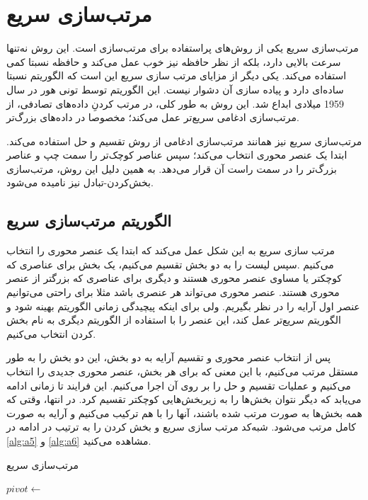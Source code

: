 \documentclass[12pt]{article}
\begin{document}
\section{مرتب‌سازی سریع\protect{}}
مرتب‌سازی سریع یکی از روش‌های پراستفاده برای مرتب‌سازی است.
این روش نه‌تنها سرعت بالایی دارد، بلکه از نظر حافظه نیز خوب عمل می‌کند و حافظه نسبتا کمی استفاده می‌کند.
یکی دیگر از مزایای مرتب سازی سریع این است که الگوریتم نسبتا ساده‌ای دارد
و پیاده سازی آن دشوار نیست.
این الگوریتم توسط تونی هور
در سال 1959 میلادی ابداع شد.\cite{quick0}
این روش به طور کلی، در مرتب کردنِ داده‌های تصادفی، از مرتب‌سازی ادغامی
سریع‌تر عمل می‌کند؛ مخصوصا در داده‌های بزرگ‌تر.\cite{quick1}

مرتب‌سازی سریع نیز همانند مرتب‌سازی ادغامی
از روش تقسیم و حل
استفاده می‌کند.
ابتدا یک عنصر محوری
انتخاب می‌کند؛ سپس عناصر کوچک‌تر را سمت چپ
و عناصر بزرگ‌تر را در سمت راست آن قرار می‌دهد.
به همین دلیل این روش، مرتب‌سازی بخش‌کردن-تبادل
نیز نامیده می‌شود.\cite{quick2}


\subsection*{الگوریتم مرتب‌سازی سریع}

مرتب سازی سریع به این شکل عمل می‌کند که ابتدا یک عنصر محوری را انتخاب می‌کنیم
.سپس لیست را به دو بخش تقسیم می‌کنیم،
یک بخش برای عناصری که کوچکتر یا مساوی عنصر محوری هستند
و دیگری برای عناصری که بزرگتر از عنصر محوری هستند.
عنصر محوری می‌تواند هر عنصری باشد مثلا برای راحتی می‌توانیم عنصر اول آرایه را در نظر بگیریم.
ولی برای اینکه پیچیدگی زمانی الگوریتم بهینه شود و الگوریتم سریع‌تر عمل کند، این عنصر را با استفاده از
الگوریتم دیگری به نام بخش کردن
انتخاب می‌کنیم.

پس از انتخاب عنصر محوری و تقسیم آرایه به دو بخش، این دو بخش را به طور مستقل مرتب می‌کنیم،
با این معنی که برای هر بخش، عنصر محوری جدیدی را انتخاب می‌کنیم و عملیات تقسیم و حل را بر روی آن اجرا می‌کنیم. این فرایند تا زمانی ادامه می‌یابد که دیگر نتوان بخش‌ها را به زیربخش‌هایی کوچکتر تقسیم کرد.
در انتها، وقتی که همه بخش‌ها به صورت مرتب شده باشند، آنها را با هم ترکیب می‌کنیم
و آرایه به صورت کامل مرتب می‌شود.
شبه‌کد مرتب سازی سریع و بخش کردن را به ترتیب در ادامه در
\cref{alg:a5}
و
\cref{alg:a6}
مشاهده می‌کنید.

\begin{algorithm}[H]
  \caption{مرتب‌سازی سریع}
  \label{alg:a5}
  \begin{latin}
    \begin{algorithmic}[1]
      \State $pivot \gets$ 
      \State {}
      \State {}
      \EndIf
      \EndProcedure
    \end{algorithmic}
  \end{latin}
\end{algorithm}
\end{document}
